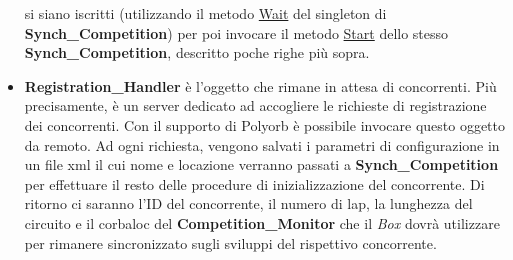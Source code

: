 \begin{itemize}
si siano iscritti (utilizzando il metodo \underline{Wait} del singleton di \textbf{Synch\_Competition}) per poi invocare il metodo \underline{Start} dello
stesso \textbf{Synch\_Competition}, descritto poche righe pi\`{u} sopra.
\item \textbf{Registration\_Handler} \`{e} l'oggetto che rimane in attesa di concorrenti. Pi\`{u} precisamente, \`{e} un server dedicato ad accogliere
le richieste di registrazione dei concorrenti. Con il supporto di Polyorb \`{e} possibile invocare questo oggetto da remoto. Ad ogni richiesta,
vengono salvati i parametri di configurazione in un file xml il cui nome e locazione verranno passati a \textbf{Synch\_Competition} per
 effettuare il resto delle procedure di inizializzazione del concorrente. Di ritorno ci saranno l'ID del concorrente, il numero di lap,
la lunghezza del circuito e il corbaloc 
del \textbf{Competition\_Monitor} che il \emph{Box} dovr\`{a} utilizzare per rimanere sincronizzato sugli sviluppi del rispettivo concorrente.
\end{itemize}
